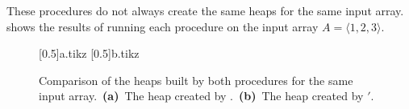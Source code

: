These procedures do not always create the same heaps for the same input array.
 shows the results of running each procedure on the input array $A=\langle1,2,3\rangle$.
\begin{figure}[htb]
    \subcaptionbox{\label{fig:6-1a}}[0.5\textwidth]{{a.tikz}}
    \subcaptionbox{\label{fig:6-1b}}[0.5\textwidth]{{b.tikz}}
    \caption{Comparison of the heaps built by both procedures for the same input array.\,
    \textbf{(a)}\, The heap created by .\,
    \textbf{(b)}\, The heap created by $'$.} \label{fig:6-1}
\end{figure}
